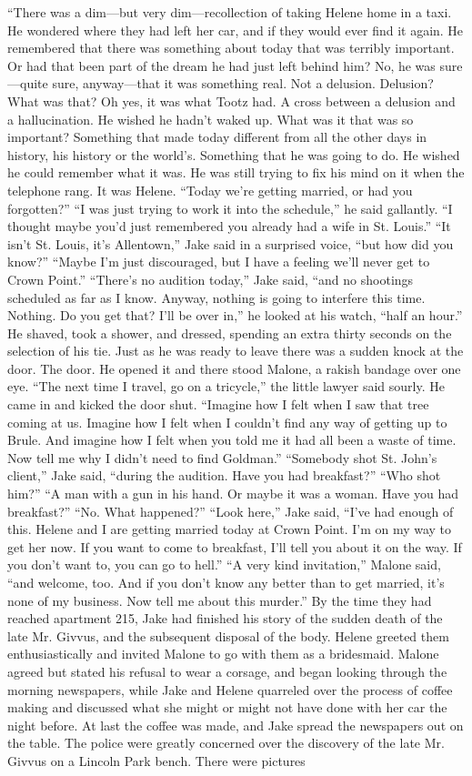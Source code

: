 \documentclass{novel}
\begin{document}
“There was a dim—but very dim—recollection of taking Helene home in a taxi. He wondered where they had left her car, and if they would ever find it again. He remembered that there was something about today that was terribly important. Or had that been part of the dream he had just left behind him? No, he was sure—quite sure, anyway—that it was something real. Not a delusion. Delusion? What was that? Oh yes, it was what Tootz had. A cross between a delusion and a hallucination. He wished he hadn’t waked up. What was it that was so important? Something that made today different from all the other days in history, his history or the world’s. Something that he was going to do. He wished he could remember what it was. He was still trying to fix his mind on it when the telephone rang. It was Helene. “Today we’re getting married, or had you forgotten?” “I was just trying to work it into the schedule,” he said gallantly. “I thought maybe you’d just remembered you already had a wife in St. Louis.” “It isn’t St. Louis, it’s Allentown,” Jake said in a surprised voice, “but how did you know?” “Maybe I’m just discouraged, but I have a feeling we’ll never get to Crown Point.” “There’s no audition today,” Jake said, “and no shootings scheduled as far as I know. Anyway, nothing is going to interfere this time. Nothing. Do you get that? I’ll be over in,” he looked at his watch, “half an hour.” He shaved, took a shower, and dressed, spending an extra thirty seconds on the selection of his tie. Just as he was ready to leave there was a sudden knock at the door. The door. He opened it and there stood Malone, a rakish bandage over one eye. “The next time I travel, go on a tricycle,” the little lawyer said sourly. He came in and kicked the door shut. “Imagine how I felt when I saw that tree coming at us. Imagine how I felt when I couldn’t find any way of getting up to Brule. And imagine how I felt when you told me it had all been a waste of time. Now tell me why I didn’t need to find Goldman.” “Somebody shot St. John’s client,” Jake said, “during the audition. Have you had breakfast?” “Who shot him?” “A man with a gun in his hand. Or maybe it was a woman. Have you had breakfast?” “No. What happened?” “Look here,” Jake said, “I’ve had enough of this. Helene and I are getting married today at Crown Point. I’m on my way to get her now. If you want to come to breakfast, I'll tell you about it on the way. If you don’t want to, you can go to hell.” “A very kind invitation,” Malone said, “and welcome, too. And if you don’t know any better than to get married, it’s none of my business. Now tell me about this murder.” By the time they had reached apartment 215, Jake had finished his story of the sudden death of the late Mr. Givvus, and the subsequent disposal of the body. Helene greeted them enthusiastically and invited Malone to go with them as a bridesmaid. Malone agreed but stated his refusal to wear a corsage, and began looking through the morning newspapers, while Jake and Helene quarreled over the process of coffee making and discussed what she might or might not have done with her car the night before. At last the coffee was made, and Jake spread the newspapers out on the table. The police were greatly concerned over the discovery of the late Mr. Givvus on a Lincoln Park bench. There were pictures 
\end{document}
